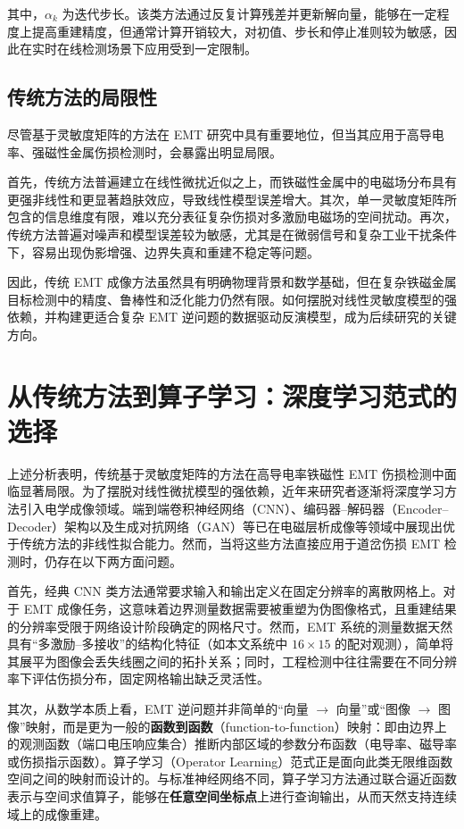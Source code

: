 其中，$\alpha_k$ 为迭代步长。该类方法通过反复计算残差并更新解向量，能够在一定程度上提高重建精度，但通常计算开销较大，对初值、步长和停止准则较为敏感，因此在实时在线检测场景下应用受到一定限制。

\subsection{传统方法的局限性}

尽管基于灵敏度矩阵的方法在 EMT 研究中具有重要地位，但当其应用于高导电率、强磁性金属伤损检测时，会暴露出明显局限。

首先，传统方法普遍建立在线性微扰近似之上，而铁磁性金属中的电磁场分布具有更强非线性和更显著趋肤效应，导致线性模型误差增大。其次，单一灵敏度矩阵所包含的信息维度有限，难以充分表征复杂伤损对多激励电磁场的空间扰动。再次，传统方法普遍对噪声和模型误差较为敏感，尤其是在微弱信号和复杂工业干扰条件下，容易出现伪影增强、边界失真和重建不稳定等问题。

因此，传统 EMT 成像方法虽然具有明确物理背景和数学基础，但在复杂铁磁金属目标检测中的精度、鲁棒性和泛化能力仍然有限。如何摆脱对线性灵敏度模型的强依赖，并构建更适合复杂 EMT 逆问题的数据驱动反演模型，成为后续研究的关键方向。

\section{从传统方法到算子学习：深度学习范式的选择}

上述分析表明，传统基于灵敏度矩阵的方法在高导电率铁磁性 EMT 伤损检测中面临显著局限。为了摆脱对线性微扰模型的强依赖，近年来研究者逐渐将深度学习方法引入电学成像领域。端到端卷积神经网络（CNN）、编码器--解码器（Encoder--Decoder）架构以及生成对抗网络（GAN）等已在电磁层析成像等领域中展现出优于传统方法的非线性拟合能力。然而，当将这些方法直接应用于道岔伤损 EMT 检测时，仍存在以下两方面问题。

首先，经典 CNN 类方法通常要求输入和输出定义在固定分辨率的离散网格上。对于 EMT 成像任务，这意味着边界测量数据需要被重塑为伪图像格式，且重建结果的分辨率受限于网络设计阶段确定的网格尺寸。然而，EMT 系统的测量数据天然具有``多激励--多接收''的结构化特征（如本文系统中 $16 \times 15$ 的配对观测），简单将其展平为图像会丢失线圈之间的拓扑关系；同时，工程检测中往往需要在不同分辨率下评估伤损分布，固定网格输出缺乏灵活性。

其次，从数学本质上看，EMT 逆问题并非简单的``向量 $\to$ 向量''或``图像 $\to$ 图像''映射，而是更为一般的\textbf{函数到函数}（function-to-function）映射：即由边界上的观测函数（端口电压响应集合）推断内部区域的参数分布函数（电导率、磁导率或伤损指示函数）。算子学习（Operator Learning）范式正是面向此类无限维函数空间之间的映射而设计的。与标准神经网络不同，算子学习方法通过联合逼近函数表示与空间求值算子，能够在\textbf{任意空间坐标点}上进行查询输出，从而天然支持连续域上的成像重建。

